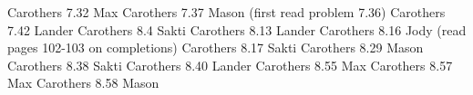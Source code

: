 \documentclass[minion]{homework641}
\begin{document}
\begin{aproblems}

\hproblem Carothers 7.32 Max
\hproblem Carothers 7.37 Mason (first read problem 7.36)
\hproblem Carothers 7.42 Lander
\hproblem Carothers 8.4 Sakti
\hproblem Carothers 8.13 Lander
\hproblem Carothers 8.16 Jody (read pages 102-103 on completions)
\hproblem Carothers 8.17 Sakti
\hproblem Carothers 8.29 Mason
\hproblem Carothers 8.38 Sakti
\hproblem Carothers 8.40 Lander
\hproblem Carothers 8.55 Max
\hproblem Carothers 8.57 Max
\hproblem Carothers 8.58 Mason

\end{aproblems}
\end{document}

